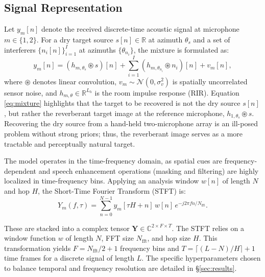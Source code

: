 \documentclass[journal,10pt]{IEEEtran}
\newcommand{\R}{\mathbb{R}}
\newcommand{\C}{\mathbb{C}}
\newcommand{\bY}{\mathbf{Y}}
\newcommand{\Ncal}{\mathcal{N}}
\newcommand{\conv}{\circledast}
\begin{document}
\subsection{Signal Representation}
Let \(y_m[n]\) denote the received discrete-time acoustic signal at microphone \(m \in \{1,2\}\). For a dry target source \(s[n]\in\R\) at azimuth \(\theta_s\) and a set of interferers \(\{n_i[n]\}_{i=1}^{I}\) at azimuths \(\{\theta_{n_i}\}\), the mixture is formulated as:
\begin{equation}
y_m[n]=(h_{m,\theta_s}\!\conv s)[n]+\sum_{i=1}^{I}(h_{m,\theta_{n_i}}\!\conv n_i)[n]+v_m[n],
\label{eq:mixture}
\end{equation}
where \(\conv\) denotes linear convolution, \(v_m\!\sim\!\Ncal(0,\sigma_v^2)\) is spatially uncorrelated sensor noise, and \(h_{m,\theta}\!\in\!\R^{L_h}\) is the room impulse response (RIR). Equation \eqref{eq:mixture} highlights that the target to be recovered is not the dry source \(s[n]\), but rather the reverberant target image at the reference microphone, \(h_{1,\theta_s}\!\conv s\). Recovering the dry source from a hand-held two-microphone array is an ill-posed problem without strong priors; thus, the reverberant image serves as a more tractable and perceptually natural target.

The model operates in the time-frequency domain, as spatial cues are frequency-dependent and speech enhancement operations (masking and filtering) are highly localized in time-frequency bins. Applying an analysis window \(w[n]\) of length \(N\) and hop \(H\), the Short-Time Fourier Transform (STFT) is:
\begin{equation}
Y_m(f,\tau)=\!\!\sum_{n=0}^{N-1}\!\!y_m[\tau H+n]\,w[n]\,e^{-j2\pi f n/N_{\mathrm{fft}}}.
\label{eq:stft_def}
\end{equation}

These are stacked into a complex tensor \(\bY\in\C^{2\times F\times T}\). The STFT relies on a window function \(w\) of length \(N\), FFT size \(N_{\mathrm{fft}}\), and hop size \(H\). This transformation yields \(F = N_{\mathrm{fft}}/2 + 1\) frequency bins and \(T = \lceil(L-N)/H\rceil + 1\) time frames for a discrete signal of length \(L\). The specific hyperparameters chosen to balance temporal and frequency resolution are detailed in \S\ref{sec:results}.
\end{document}
